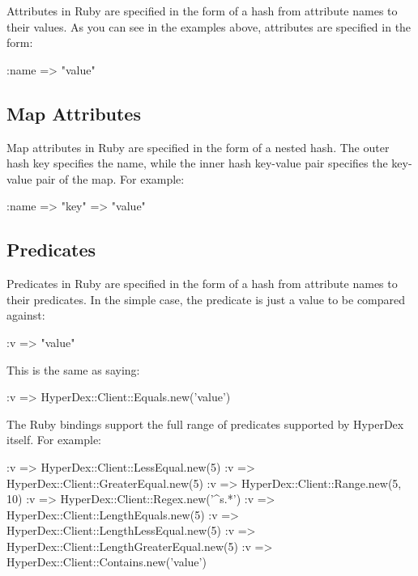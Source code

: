 Attributes in Ruby are specified in the form of a hash from attribute names to
their values.  As you can see in the examples above, attributes are specified in
the form:

\begin{rubycode}
{:name => "value"}
\end{rubycode}

\subsection{Map Attributes}
\label{sec:api:ruby:map-attributes}

Map attributes in Ruby are specified in the form of a nested hash.  The outer
hash key specifies the name, while the inner hash key-value pair specifies the
key-value pair of the map.  For example:

\begin{rubycode}
{:name => {"key" => "value"}}
\end{rubycode}

\subsection{Predicates}
\label{sec:api:ruby:predicates}

Predicates in Ruby are specified in the form of a hash from attribute names to
their predicates.  In the simple case, the predicate is just a value to be
compared against:

\begin{rubycode}
{:v => "value"}
\end{rubycode}

This is the same as saying:

\begin{rubycode}
{:v => HyperDex::Client::Equals.new('value')}
\end{rubycode}

The Ruby bindings support the full range of predicates supported by HyperDex
itself.  For example:

\begin{rubycode}
{:v => HyperDex::Client::LessEqual.new(5)}
{:v => HyperDex::Client::GreaterEqual.new(5)}
{:v => HyperDex::Client::Range.new(5, 10)}
{:v => HyperDex::Client::Regex.new('^s.*')}
{:v => HyperDex::Client::LengthEquals.new(5)}
{:v => HyperDex::Client::LengthLessEqual.new(5)}
{:v => HyperDex::Client::LengthGreaterEqual.new(5)}
{:v => HyperDex::Client::Contains.new('value')}
\end{rubycode}

